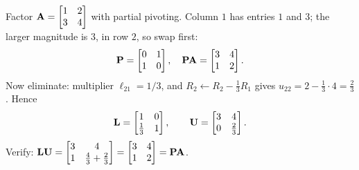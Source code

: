 \begin{example}[A full $\mat{P}\mat{A}=\mat{L}\mat{U}$]
\label{ch09:ex-palu}
Factor $\mathbf{A}=\begin{bmatrix} 1 & 2 \\ 3 & 4 \end{bmatrix}$ with partial pivoting. Column
$1$ has entries $1$ and $3$; the larger magnitude is $3$, in row $2$, so swap first:
\[
  \mathbf{P} = \begin{bmatrix} 0&1\\1&0 \end{bmatrix},\quad
  \mathbf{P}\mathbf{A} = \begin{bmatrix} 3 & 4 \\ 1 & 2 \end{bmatrix}.
\]
Now eliminate: multiplier $\ell_{21}=1/3$, and
$R_2 \leftarrow R_2 - \tfrac13 R_1$ gives $u_{22} = 2 - \tfrac13\cdot 4 = \tfrac23$. Hence
\[
  \mathbf{L} = \begin{bmatrix} 1 & 0 \\ \tfrac13 & 1 \end{bmatrix}, \qquad
  \mathbf{U} = \begin{bmatrix} 3 & 4 \\ 0 & \tfrac23 \end{bmatrix}.
\]
Verify: $\mathbf{L}\mathbf{U} = \begin{bmatrix} 3 & 4 \\ 1 & \tfrac43 + \tfrac23 \end{bmatrix}
= \begin{bmatrix} 3 & 4 \\ 1 & 2 \end{bmatrix} = \mathbf{P}\mathbf{A}$. \checkmark
\end{example}


